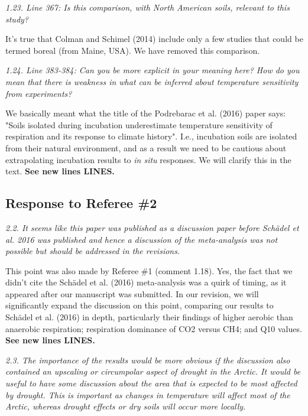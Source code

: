 \documentclass[11pt, oneside]{article}
\begin{document}
\medskip
{\it 1.23. Line 367: Is this comparison, with North American soils, relevant to this study? }

It's true that Colman and Schimel (2014) include only a few studies that could be termed boreal (from Maine, USA). We have removed this comparison.

\medskip
{\it 1.24. Line 383-384: Can you be more explicit in your meaning here? How do you mean that there is weakness in what can be inferred about temperature sensitivity from experiments? }

We basically meant what the title of the Podrebarac et al. (2016) paper says: "Soils isolated during incubation underestimate temperature sensitivity of respiration and its response to climate history". I.e., incubation soils are isolated from their natural environment, and as a result we need to be cautious about extrapolating incubation results to {\it in situ} responses. We will clarify this in the text. {\bf See new lines LINES.}


\newpage
\subsection*{Response to Referee \#2}

{\it 2.2. It seems like this paper was published as a discussion paper before Schädel et al. 2016 was published and hence a discussion of the meta-analysis was not possible but should be addressed in the revisions. }

This point was also made by Referee \#1 (comment 1.18). Yes, the fact that we didn't cite the Schädel et al. (2016) meta-analysis was a quirk of timing, as it appeared after our manuscript was submitted. In our revision, we will significantly expand the discussion on this point, comparing our results to Schädel et al. (2016) in depth, particularly their findings of higher aerobic than anaerobic respiration; respiration dominance of CO2 versus CH4; and Q10 values. {\bf See new lines LINES.}

\medskip
{\it 2.3. The importance of the results would be more obvious if the discussion also contained an upscaling or circumpolar aspect of drought in the Arctic. It would be useful to have some discussion about the area that is expected to be most affected by drought. This is important as changes in temperature will affect most of the Arctic, whereas drought effects or dry soils will occur more locally. }
\end{document}
